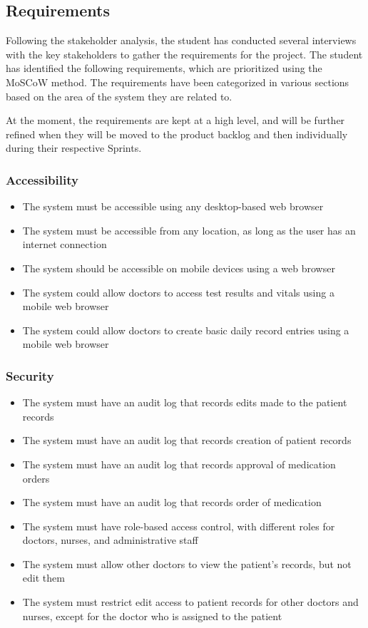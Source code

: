 \subsection{Requirements}

Following the stakeholder analysis, the student has conducted several interviews with the key stakeholders to gather the requirements for the project. The student has identified the following requirements, which are prioritized using the MoSCoW method. The requirements have been categorized in various sections based on the area of the system they are related to. 

At the moment, the requirements are kept at a high level, and will be further refined when they will be moved to the product backlog and then individually during their respective Sprints.

\subsubsection{Accessibility}
\begin{itemize}
    \item The system must be accessible using any desktop-based web browser
    \item The system must be accessible from any location, as long as the user has an internet connection
    \item The system should be accessible on mobile devices using a web browser
    \item The system could allow doctors to access test results and vitals using a mobile web browser
    \item The system could allow doctors to create basic daily record entries using a mobile web browser
\end{itemize}

\subsubsection{Security}
\begin{itemize}
    \item The system must have an audit log that records edits made to the patient records
    \item The system must have an audit log that records creation of patient records
    \item The system must have an audit log that records approval of medication orders
    \item The system must have an audit log that records order of medication
    \item The system must have role-based access control, with different roles for doctors, nurses, and administrative staff
    \item The system must allow other doctors to view the patient's records, but not edit them
    \item The system must restrict edit access to patient records for other doctors and nurses, except for the doctor who is assigned to the patient
\end{itemize}

